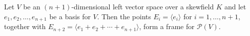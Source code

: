 Let $V$ be an $(n+1)$-dimensional left vector space over a skewfield $K$ and let $e_1, e_2, \dots, e_{n+1}$ be a basis for $V$. Then the points $E_i = \langle e_i \rangle$ for $i = 1, \dots, n+1$, together with $E_{n+2} = \langle e_1 + e_2 + \cdots + e_{n+1} \rangle$, form a frame for $\mathcal{P}(V)$.
